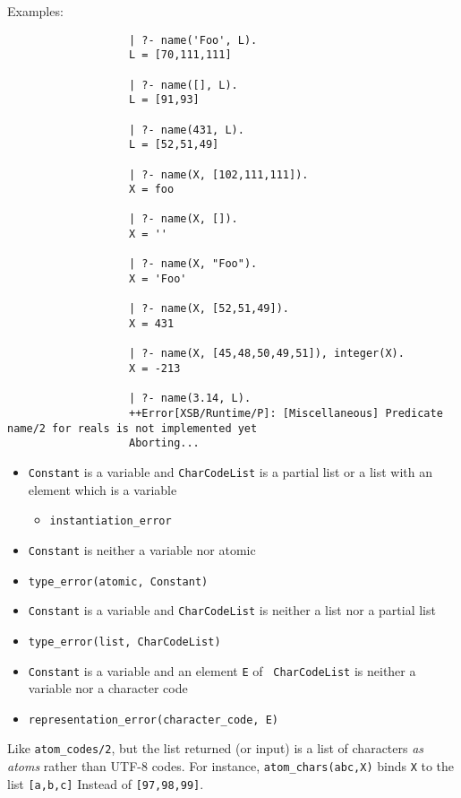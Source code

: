 \begin{description}
    Examples:
    {\footnotesize
     \begin{verbatim}
                   | ?- name('Foo', L).
                   L = [70,111,111]

                   | ?- name([], L).
                   L = [91,93]

                   | ?- name(431, L).
                   L = [52,51,49]

                   | ?- name(X, [102,111,111]).
                   X = foo
 
                   | ?- name(X, []).
                   X = ''

                   | ?- name(X, "Foo").
                   X = 'Foo'

                   | ?- name(X, [52,51,49]).
                   X = 431

                   | ?- name(X, [45,48,50,49,51]), integer(X).
                   X = -213

                   | ?- name(3.14, L).
                   ++Error[XSB/Runtime/P]: [Miscellaneous] Predicate name/2 for reals is not implemented yet
                   Aborting...
     \end{verbatim}}

\begin{itemize}
\item {\tt Constant} is a variable and {\tt CharCodeList} is a partial
  list or a list with an element which is a variable
\begin{itemize}
\item {\tt instantiation\_error}
\end{itemize}
\item {\tt Constant} is neither a variable nor atomic
\bi
\item {\tt type\_error(atomic, Constant)}
\ei
\item {\tt Constant} is a variable and {\tt CharCodeList} is neither a
  list nor a partial list 
\bi
\item {\tt type\_error(list, CharCodeList)}
\ei
\item {\tt Constant} is a variable and an element {\tt E} of {\tt
  CharCodeList} is neither a variable nor a character code 
\bi
\item {\tt representation\_error(character\_code, E)}
\ei
\end{itemize}

    Like \verb|atom_codes/2|, but the list returned (or input) is a list of
    characters \emph{as atoms} rather than UTF-8 codes. For instance, 
    \verb|atom_chars(abc,X)| binds {\tt X} to the list {\tt [a,b,c]}
    Instead of {\tt [97,98,99]}.


\end{description}
